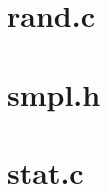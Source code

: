 \section{rand.c}\label{appendix-rand}


\section{smpl.h}\label{appendix-header}


\section{stat.c}\label{appendix-stat}

